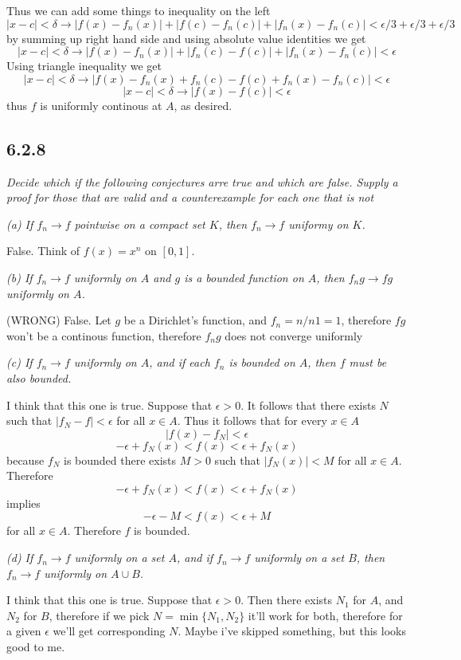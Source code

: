 \documentclass[11pt,oneside,titlepage]{book}
\begin{document}
Thus we can add some things to inequality on the left
$$|x - c| < \delta  \to |f(x) - f_n(x)| +
| f(c) - f_n(c) | + |f_n(x) - f_n(c)| < \epsilon/3 + \epsilon/3 + \epsilon/3$$
by summing up right hand side and using absolute value identities we get
$$|x - c| < \delta  \to |f(x) - f_n(x)| +
| f_n(c) - f(c) | + |f_n(x) - f_n(c)| < \epsilon$$
Using triangle inequality we get
$$|x - c| < \delta  \to |f(x) - f_n(x) +
f_n(c) - f(c)  + f_n(x) - f_n(c)| < \epsilon$$
$$|x - c| < \delta  \to |f(x) - f(c)| < \epsilon$$
thus $f$ is uniformly continous at $A$, as desired.

\subsection*{6.2.8}
\textit{Decide which if the following conjectures arre true and which are
  false. Supply a proof for those that are valid and a counterexample for
  each one that is not }

\textit{(a) If $f_n \to f$ pointwise on a compact set $K$, then $f_n \to f$
  uniformy on $K$.}

False. Think of $f(x) = x^n$ on $[0, 1]$.

\textit{(b) If $f_n \to f$ uniformly on $A$ and $g$ is a bounded function on
  $A$, then $f_ng \to fg$ uniformly on $A$.}

(WRONG)
False. Let $g$ be a Dirichlet's function, and $f_n = n/n 1 = 1$,
therefore $fg$ won't be a continous function, therefore $f_ng$ does not
converge uniformly

\textit{(c) If $f_n \to f$ uniformly on $A$, and if each $f_n$ is bounded
  on $A$, then $f$ must be also bounded.}

I think that this one is true. Suppose that $\epsilon > 0$. It follows that
there exists $N$ such that $|f_N - f| < \epsilon$ for all $x \in A$. Thus
it follows that for every $x \in A$
$$|f(x) - f_N| < \epsilon$$
$$-\epsilon + f_N(x)< f(x)  < \epsilon + f_N(x)$$
because $f_N$ is bounded there exists $M > 0$ such that
$|f_N(x)| < M$ for all $x \in A$. Therefore
$$-\epsilon + f_N(x)< f(x)  < \epsilon + f_N(x)$$
implies
$$-\epsilon - M < f(x)  < \epsilon + M$$
for all $x \in A$. Therefore $f$ is bounded.

\textit{(d) If $f_n \to f$ uniformly on a set $A$, and if $f_n \to f$ uniformly
  on a set $B$, then $f_n \to f$ uniformly on $A \cup B$.}

I  think that this one is true. Suppose that $\epsilon > 0$. Then there
exists $N_1$ for $A$, and $N_2$ for $B$, therefore if we pick
$N = \min\{N_1, N_2\}$ it'll work for both, therefore for a given $\epsilon$
we'll get corresponding $N$. Maybe i've skipped something, but this looks
good to me.
\end{document}
